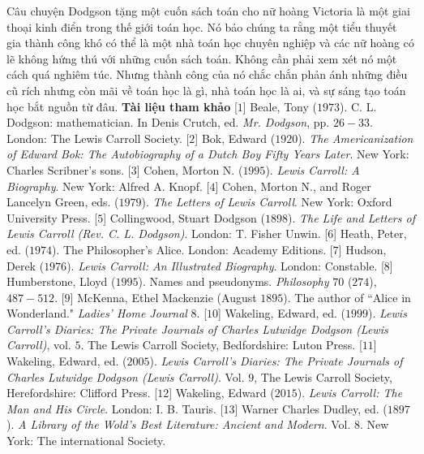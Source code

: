 \begin{multicols}{2}
	\vskip 0.1cm
	Câu chuyện Dodgson tặng một cuốn sách toán cho nữ hoàng Victoria là một giai thoại kinh điển trong thế giới toán học. Nó bảo chúng ta rằng một tiểu thuyết gia thành công khó có thể là một nhà toán học chuyên nghiệp và các nữ hoàng có lẽ không hứng thú với những cuốn sách toán. Không cần phải xem xét nó một cách quá nghiêm túc. Nhưng  thành công của nó chắc chắn phản ánh những điều cũ rích nhưng còn mãi về toán học là gì, nhà toán học là ai, và sự sáng tạo toán học bắt nguồn từ đâu.
	\vskip 0.1cm
	\textbf{\color{quantoan}Tài liệu tham khảo} 
	\vskip 0.1cm
	[$1$]	Beale, Tony ($1973$). C. L. Dodgson: mathematician. In Denis Crutch, ed. \textit{Mr. Dodgson}, pp. $26-33$. London: The Lewis Carroll Society.
	\vskip 0.1cm
	[$2$]	Bok, Edward ($1920$). \textit{The Americanization of Edward Bok: The Autobiography of a Dutch Boy Fifty Years Later}. New York: Charles Scribner’s sons.
	\vskip 0.1cm
	[$3$]	Cohen, Morton N. ($1995$). \textit{Lewis Carroll: A Biography}. New York: Alfred A. Knopf.
	\vskip 0.1cm
	[$4$]	Cohen, Morton N., and Roger Lancelyn Green, eds. ($1979$). \textit{The Letters of Lewis Carroll}. New York: Oxford University Press.
	\vskip 0.1cm
	[$5$]	Collingwood, Stuart Dodgson ($1898$). \textit{The Life and Letters of Lewis Carroll (Rev. C. L. Dodgson)}. London: T. Fisher Unwin.
	\vskip 0.1cm
	[$6$]	Heath, Peter, ed. ($1974$). The Philosopher’s Alice. London: Academy Editions.
	\vskip 0.1cm
	[$7$]	Hudson, Derek ($1976$). \textit{Lewis Carroll: An Illustrated Biography}. London: Constable.
	\vskip 0.1cm
	[$8$]	Humberstone, Lloyd ($1995$). Names and pseudonyms. \textit{Philosophy} $70$ ($274$), $487-512$.
	\vskip 0.1cm
	[$9$]	McKenna, Ethel Mackenzie (August $1895$). The author of ``Alice in Wonderland." \textit{Ladies’ Home Journal} $8$.
	\vskip 0.1cm
	[$10$]	Wakeling, Edward, ed. ($1999$). \textit{Lewis Carroll’s Diaries: The Private Journals of Charles Lutwidge Dodgson (Lewis Carroll)}, vol. $5$. The Lewis Carroll Society, Bedfordshire: Luton Press.
	\vskip 0.1cm
	[$11$]	Wakeling, Edward, ed. ($2005$). \textit{Lewis Carroll’s Diaries: The Private Journals of Charles Lutwidge Dodgson (Lewis Carroll)}. Vol. $9$, The Lewis Carroll Society, Herefordshire: Clifford Press.
	\vskip 0.1cm
	[$12$]	Wakeling, Edward ($2015$). \textit{Lewis Carroll: The Man and His Circle}. London: I. B. Tauris.
	\vskip 0.1cm
	[$13$]	Warner Charles Dudley, ed. ($1897$). \textit{A Library of the Wold’s Best Literature: Ancient and Modern}. Vol. $8$. New York: The international Society.
\end{multicols}